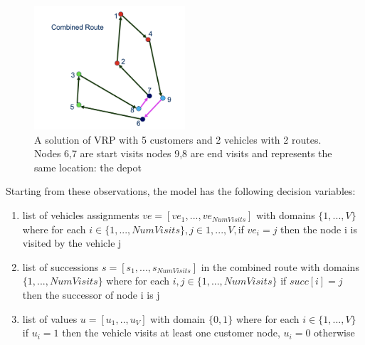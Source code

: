 \begin{figure}[h]
    \centering
    \includegraphics[width=0.5\textwidth]{images/combined-route-solution.png}
    \caption{A solution of VRP with 5 customers and 2 vehicles with 2 routes. Nodes 6,7 are start visits nodes 9,8 are end visits and represents the same location: the depot}
    \label{fig:mesh1}
\end{figure}

Starting from these observations, the model has the following decision variables:
\begin{enumerate}
    \item list of vehicles assignments \begin{math}ve = [ve_{1}, ..., ve_{NumVisits}] \end{math} with domains \begin{math}\{1,...,V\}\end{math}where for each \begin{math}i \in \{1,..., NumVisits\}, j \in {1,...,V} ,\end{math}if \begin{math} ve_{i} = j\end{math} then the node i is visited by the vehicle j
    \item list of successions \begin{math}s=[s_{1},...,s_{NumVisits}]\end{math} in the combined route with domains \begin{math}\{1,..., NumVisits\}\end{math} where for each \begin{math}i,j \in \{1,..., NumVisits\}\end{math} if \begin{math}succ[i] = j\end{math} then the successor of node i is j
    \item list of values \begin{math}u=[u_{1},.., u_{V}]\end{math} with domain \begin{math}\{0,1\}\end{math} where for each \begin{math}i \in \{1,...,V\}\end{math} if \begin{math}u_{i} = 1 \end{math} then the vehicle visits at least one customer node, \begin{math} u_{i} = 0\end{math} otherwise
\end{enumerate}
\newpage
